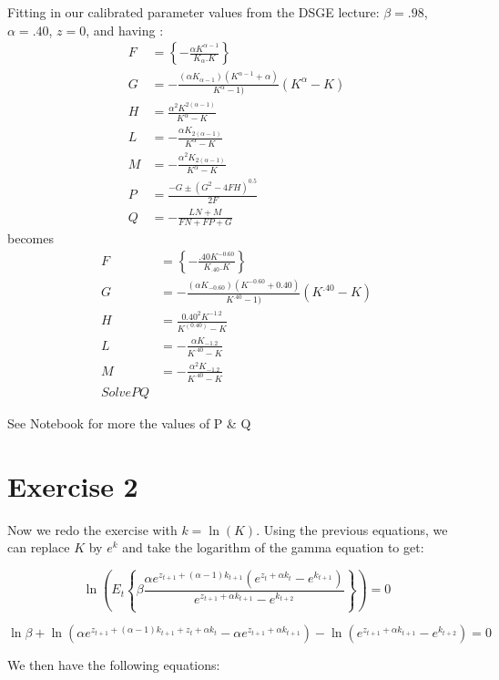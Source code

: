 \documentclass[11pt]{article}
\numberwithin{equation}{section}
\theoremstyle{plain}
\theoremstyle{definition}
\newcommand\parens[1]{\left( #1 \right)}
\newcommand{\1}{\mathbbm 1}
\def\a{\alpha}
\def\b{\beta}
\begin{document}
\noindent Fitting in our calibrated parameter values from the DSGE lecture: $\b=.98$, $\a=.40$, $z=0$, and having :
\begin{align}
F &=  \left\{- \frac{\a K^{\a - 1}}{K_\a. K} \right\}\\
G &= -\frac{(\a K_{\a-1})(K^{\a-1} + \a)}{K^\a - 1)}{(K^\a-K)}\\
H &= \frac{\a^2 K^{2(\a-1)}}{K^\a - K}\\
L &= - \frac{\a K_{2(\a-1)}}{K^\a - K}\\
M &= - \frac{\a^2 K_{2(\a-1)}}{K^\a - K}\\
P &= \frac{-G \pm (G^2 - 4FH)^{0.5}}{2F}\\
Q &= - \frac{LN + M}{FN + FP + G}
\end{align}
becomes
\begin{align}
F &=  \left\{-\frac{.40 K^{-0.60}}{K_{.40}. K} \right\}\\
G &= -\frac{(\a K_{-0.60})(K^{-0.60} + 0.40)}{K^{.40} - 1)}{(K^{.40}-K)}\\
H &= \frac{0.40^2 K^{-1.2}}{K^({0.40}) - K}\\
L &= - \frac{\a K_{-1.2}}{K^{.40} - K}\\
M &= - \frac{\a^2 K_{-1.2}}{K^{.40} - K}\\
Solve P Q
\end{align}

See Notebook for more the values of P \& Q

\section*{Exercise 2}

Now we redo the exercise with $k = \ln(K)$. Using the previous equations, we can replace $K$ by $e^k$ and take the logarithm of the gamma equation to get:

\begin{equation}
	\ln \parens{E_t \left\{\b \frac{ \a e^{z_{t+1} + (\a - 1)k_{t+1}} ( e^{z_t + \a k_t} - e^{ k_{t+1}})}{e^{z_{t+1} + \a k_{t+1}} - e^{k_{t+2}}} \right\}} = 0 
\end{equation}

\begin{equation}
\ln \b +  \ln \parens{\a e^{z_{t+1} + (\a - 1)k_{t+1} + z_t + \a k_t} - \a e^{z_{t+1} + \a k_{t+1}}} - \ln \parens{e^{z_{t+1} + \a k_{t+1}} - e^{k_{t+2}}} = 0
\end{equation}


We then have the following equations:
\end{document}
